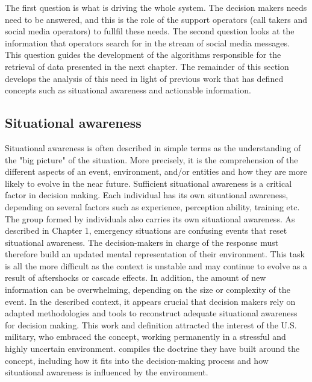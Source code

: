 The first question is what is driving the whole system.
The decision makers needs need to be answered, and this is the role of the support operators (call takers and social media operators) to fullfil these needs.
The second question looks at the information that operators search for in the stream of social media messages.
This question guides the development of the algorithms responsible for the retrieval of data presented in the next chapter.
The remainder of this section develops the analysis of this need in light of previous work that
has defined concepts such as situational awareness and actionable information.

\subsection{Situational awareness}
Situational awareness is often described in simple terms as the understanding of the "big picture" of the situation.
More precisely, it is the comprehension of the different aspects of an event, environment, and/or entities and how they are more likely to evolve in the near future.
Sufficient situational awareness is a critical factor in decision making.
Each individual has its own situational awareness, depending on several factors such as experience, perception ability, training etc.
The group formed by individuals also carries its own situational awareness.
As described in Chapter 1, emergency situations are confusing events that reset situational awareness.
The decision-makers in charge of the response must therefore build an updated mental representation of their environment.
This task is all the more difficult as the context is unstable and may continue to evolve as a result of aftershocks or cascade effects.
In addition, the amount of new information can be overwhelming, depending on the size or complexity of the event.
In the described context, it appears crucial that decision makers rely on adapted methodologies and tools to reconstruct adequate situational awareness for decision making.
This work and definition attracted the interest of the U.S. military, who embraced the concept, working permanently in a stressful and highly uncertain environment.
\textcite{departmentofthearmyAdvancedSituationalAwareness2021} compiles the doctrine they have built around the concept, including how it fits into the decision-making process and how situational awareness is influenced by the environment.

